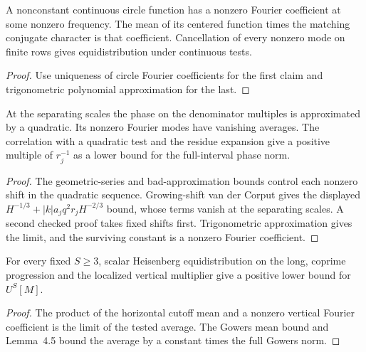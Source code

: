 \begin{lemma}\label{checked-separating-fourier}
\leanok
A nonconstant continuous circle function has a nonzero Fourier
coefficient at some nonzero frequency. The mean of its centered
function times the matching conjugate character is that coefficient.
Cancellation of every nonzero mode on finite rows gives
equidistribution under continuous tests.
\end{lemma}
\begin{proof}
\leanok
Use uniqueness of circle Fourier coefficients for the first
claim and trigonometric polynomial approximation for the last.
\end{proof}

\begin{lemma}\label{checked-separating-quadratic}
\leanok
At the separating scales the phase on the denominator multiples
is approximated by a quadratic. Its nonzero Fourier modes have
vanishing averages. The correlation with a quadratic test and
the residue expansion give a positive multiple of $r_j^{-1}$
as a lower bound for the full-interval phase norm.
\end{lemma}
\begin{proof}
\leanok
The geometric-series and bad-approximation bounds control each
nonzero shift in the quadratic sequence. Growing-shift van der
Corput gives the displayed $H^{-1/3}+|k|a_jq^2r_jH^{-2/3}$ bound,
whose terms vanish at the separating scales. A second checked
proof takes fixed shifts first. Trigonometric approximation gives
the limit, and the surviving constant is a nonzero Fourier coefficient.
\end{proof}

\begin{lemma}\label{checked-separating-gowers}
\leanok
For every fixed $S\ge3$, scalar Heisenberg equidistribution on
the long, coprime progression and the localized vertical
multiplier give a positive lower bound for $U^S[M]$.
\end{lemma}
\begin{proof}
\leanok
The product of the horizontal cutoff mean and a nonzero
vertical Fourier coefficient is the limit of the tested
average. The Gowers mean bound and Lemma~4.5 bound the
average by a constant times the full Gowers norm.
\end{proof}
